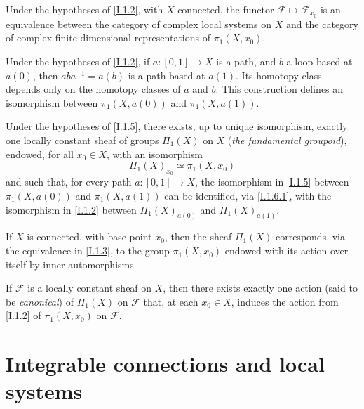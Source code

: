 \documentclass{report}
\theoremstyle{plain}
\newenvironment{proposition}[1]
    {\renewcommand\theinnercustomproposition{#1}\innercustomproposition}
    {\endinnercustomproposition}
\newenvironment{corollary}[1]
    {\renewcommand\theinnercustomcorollary{#1}\innercustomcorollary}
    {\endinnercustomcorollary}
\theoremstyle{definition}
\newenvironment{env}[1]
    {\renewcommand\theinnercustomenv{#1}\innercustomenv}
    {\endinnercustomenv}
\newcommand{\sh}[1]{{\mathscr{#1}}}
\newcommand{\oldpage}[1]{\marginpar{\footnotesize$\Big\vert$ \textit{p.~#1}}}
\begin{document}
\oldpage{4}
\begin{corollary}{1.4}
\label{I.1.4}
  Under the hypotheses of \cref{I.1.2}, with $X$ connected, the functor $\sh{F}\mapsto\sh{F}_{x_0}$ is an equivalence between the category of complex local systems on $X$ and the category of complex finite-dimensional representations of $\pi_1(X,x_0)$.
\end{corollary}

\begin{env}{1.5}
\label{I.1.5}
  Under the hypotheses of \cref{I.1.2}, if $a\colon[0,1]\to X$ is a path, and $b$ a loop based at $a(0)$, then $aba^{-1}=a(b)$ is a path based at $a(1)$.
  Its homotopy class depends only on the homotopy classes of $a$ and $b$.
  This construction defines an isomorphism between $\pi_1(X,a(0))$ and $\pi_1(X,a(1))$.
\end{env}

\begin{proposition}{1.6}
\label{I.1.6}
  Under the hypotheses of \cref{I.1.5}, there exists, up to unique isomorphism, exactly one locally constant sheaf of groups $\Pi_1(X)$ on $X$ (\emph{the fundamental groupoid}), endowed, for all $x_0\in X$, with an isomorphism
  \[
  \label{I.1.6.1}
    \Pi_1(X)_{x_0} \simeq \pi_1(X,x_0)
  \tag{1.6.1}
  \]
  and such that, for every path $a\colon[0,1]\to X$, the isomorphism in \cref{I.1.5} between $\pi_1(X,a(0))$ and $\pi_1(X,a(1))$ can be identified, via \cref{I.1.6.1}, with the isomorphism in \cref{I.1.2} between $\Pi_1(X)_{a(0)}$ and $\Pi_1(X)_{a(1)}$.
\end{proposition}

If $X$ is connected, with base point $x_0$, then the sheaf $\Pi_1(X)$ corresponds, via the equivalence in \cref{I.1.3}, to the group $\pi_1(X,x_0)$ endowed with its action over itself by inner automorphisms.

\begin{proposition}{1.7}
\label{I.1.7}
  If $\sh{F}$ is a locally constant sheaf on $X$, then there exists exactly one action (said to be \emph{canonical}) of $\Pi_1(X)$ on $\sh{F}$ that, at each $x_0\in X$, induces the action from \cref{I.1.2} of $\pi_1(X,x_0)$ on $\sh{F}$.
\end{proposition}


\section{Integrable connections and local systems}
\label{I.2}

\oldpage{5}
\end{document}
